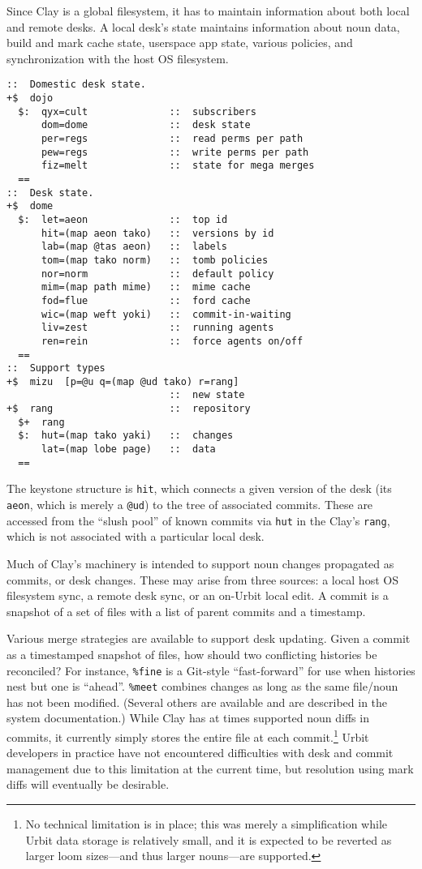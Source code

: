 \documentclass[twoside]{article}
\begin{document}
Since Clay is a global filesystem, it has to maintain information about both local and remote desks.  A local desk's state maintains information about noun data, build and mark cache state, userspace app state, various policies, and synchronization with the host OS filesystem.

\begin{lstlisting}[caption={Clay desk types},
                   style=listingcode]
::  Domestic desk state.
+$  dojo
  $:  qyx=cult              ::  subscribers
      dom=dome              ::  desk state
      per=regs              ::  read perms per path
      pew=regs              ::  write perms per path
      fiz=melt              ::  state for mega merges
  ==
::  Desk state.
+$  dome
  $:  let=aeon              ::  top id
      hit=(map aeon tako)   ::  versions by id
      lab=(map @tas aeon)   ::  labels
      tom=(map tako norm)   ::  tomb policies
      nor=norm              ::  default policy
      mim=(map path mime)   ::  mime cache
      fod=flue              ::  ford cache
      wic=(map weft yoki)   ::  commit-in-waiting
      liv=zest              ::  running agents
      ren=rein              ::  force agents on/off
  ==
::  Support types
+$  mizu  [p=@u q=(map @ud tako) r=rang]
                            ::  new state
+$  rang                    ::  repository
  $+  rang
  $:  hut=(map tako yaki)   ::  changes
      lat=(map lobe page)   ::  data
  ==
\end{lstlisting}

The keystone structure is \texttt{hit}, which connects a given version of the desk (its \texttt{aeon}, which is merely a \texttt{@ud}) to the tree of associated commits.  These are accessed from the ``slush pool'' of known commits via \texttt{hut} in the Clay's \texttt{rang}, which is not associated with a particular local desk.

Much of Clay's machinery is intended to support noun changes propagated as commits, or desk changes.  These may arise from three sources:  a local host OS filesystem sync, a remote desk sync, or an on-Urbit local edit.  A commit is a snapshot of a set of files with a list of parent commits and a timestamp.

Various merge strategies are available to support desk updating.  Given a commit as a timestamped snapshot of files, how should two conflicting histories be reconciled?  For instance, \lstinline[style=inlinecode]{%fine} is a Git-style ``fast-forward'' for use when histories nest but one is ``ahead''.  \lstinline[style=inlinecode]{%meet} combines changes as long as the same file/noun has not been modified.  (Several others are available and are described in the system documentation.)  While Clay has at times supported noun diffs in commits, it currently simply stores the entire file at each commit.\footnote{No technical limitation is in place; this was merely a simplification while Urbit data storage is relatively small, and it is expected to be reverted as larger loom sizes—and thus larger nouns—are supported.}  Urbit developers in practice have not encountered difficulties with desk and commit management due to this limitation at the current time, but resolution using mark diffs will eventually be desirable.
\end{document}
